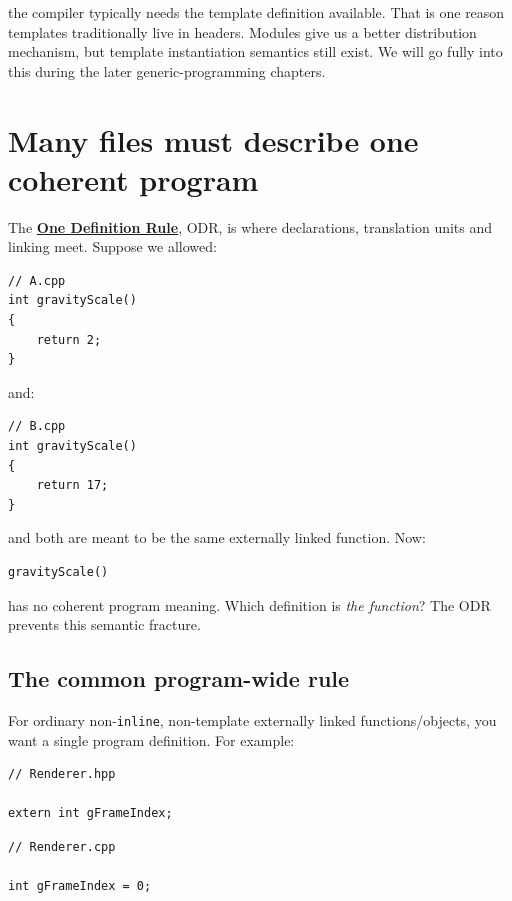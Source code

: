the compiler typically needs the template definition available. That is one reason templates traditionally live in headers. Modules give us a better distribution mechanism, but template instantiation semantics still exist. We will go fully into this during the later generic-programming chapters.

\section{Many files must describe one coherent program}\label{01-foundations-i-ch002-many-files-must-describe-one-coherent-program}

The \textbf{\hyperref[appendix-49d27bc9d9a5]{One Definition Rule}}, ODR, is where declarations, translation units and linking meet. Suppose we allowed:

\begin{verbatim}
// A.cpp
int gravityScale()
{
    return 2;
}
\end{verbatim}

and:

\begin{verbatim}
// B.cpp
int gravityScale()
{
    return 17;
}
\end{verbatim}

and both are meant to be the same externally linked function. Now:

\begin{verbatim}
gravityScale()
\end{verbatim}

has no coherent program meaning. Which definition is \emph{the function}? The ODR prevents this semantic fracture.

\subsection{The common program-wide rule}\label{01-foundations-i-ch002-the-common-program-wide-rule}

For ordinary non-\texttt{inline}, non-template externally linked functions/objects, you want a single program definition. For example:

\begin{verbatim}
// Renderer.hpp

extern int gFrameIndex;
\end{verbatim}

\begin{verbatim}
// Renderer.cpp

int gFrameIndex = 0;
\end{verbatim}


